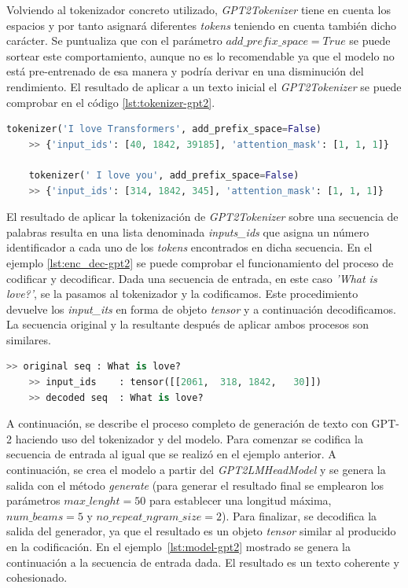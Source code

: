 Volviendo al tokenizador concreto utilizado, \textit{GPT2Tokenizer} tiene en cuenta los espacios y por tanto asignará diferentes \textit{tokens} teniendo en cuenta también dicho carácter. Se puntualiza que con el parámetro $add\_prefix\_space=True$ se puede sortear este comportamiento, aunque no es lo recomendable ya que el modelo no está pre-entrenado de esa manera y podría derivar en una disminución del rendimiento. El resultado de aplicar a un texto inicial el \textit{GPT2Tokenizer} se puede comprobar en el código \ref{lst:tokenizer-gpt2}.

\begin{lstlisting}[language=Python, caption=Ejemplo de uso de \textit{GPT2Tokenizer}, label={lst:tokenizer-gpt2}]
	tokenizer('I love Transformers', add_prefix_space=False)
	>> {'input_ids': [40, 1842, 39185], 'attention_mask': [1, 1, 1]}
	
	tokenizer(' I love you', add_prefix_space=False)
	>> {'input_ids': [314, 1842, 345], 'attention_mask': [1, 1, 1]}
\end{lstlisting} 

El resultado de aplicar la tokenización de \textit{GPT2Tokenizer} sobre una secuencia de palabras resulta en una lista denominada \textit{inputs\_ids} que asigna un número identificador a cada uno de los \textit{tokens} encontrados en dicha secuencia. En el ejemplo \ref{lst:enc_dec-gpt2} se puede comprobar el funcionamiento del proceso de codificar y decodificar. Dada una secuencia de entrada, en este caso \textit{'What is love?'}, se la pasamos al tokenizador y la codificamos. Este procedimiento devuelve los \textit{input\_its} en forma de objeto \textit{tensor} y a continuación decodificamos. La secuencia original y la resultante después de aplicar ambos procesos son similares.

\begin{lstlisting}[language=Python, caption= Encode y Decode, label={lst:enc_dec-gpt2}]
	>> original seq : What is love?
	>> input_ids    : tensor([[2061,  318, 1842,   30]])
	>> decoded seq  : What is love?
\end{lstlisting} 

A continuación, se describe el proceso completo de generación de texto con GPT-2 haciendo uso del tokenizador y del modelo. Para comenzar se codifica la secuencia de entrada al igual que se realizó en el ejemplo anterior. A continuación, se crea el modelo a partir del \textit{GPT2LMHeadModel} y se genera la salida con el método \textit{generate} (para generar el resultado final se emplearon los parámetros $max\_lenght=50$ para establecer una longitud máxima, $num\_beams=5$ y $no\_repeat\_ngram\_size=2$). Para finalizar, se decodifica la salida del generador, ya que el resultado es un objeto \textit{tensor} similar al producido en la codificación. En el ejemplo~\ref{lst:model-gpt2} mostrado se genera la continuación a la secuencia de entrada dada. El resultado es un texto coherente y cohesionado.

